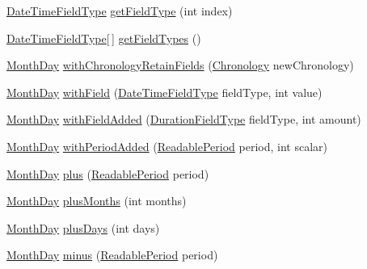 \begin{DoxyCompactItemize}
\hyperlink{classorg_1_1joda_1_1time_1_1_date_time_field_type}{Date\-Time\-Field\-Type} \hyperlink{classorg_1_1joda_1_1time_1_1_month_day_aec54e0264beec25837765b09426116ca}{get\-Field\-Type} (int index)
\item 
\hyperlink{classorg_1_1joda_1_1time_1_1_date_time_field_type}{Date\-Time\-Field\-Type}\mbox{[}$\,$\mbox{]} \hyperlink{classorg_1_1joda_1_1time_1_1_month_day_afae6cc3f6e956a80c9c72eb57085e634}{get\-Field\-Types} ()
\item 
\hyperlink{classorg_1_1joda_1_1time_1_1_month_day}{Month\-Day} \hyperlink{classorg_1_1joda_1_1time_1_1_month_day_afee9114b37976ec8cc136e2e402aff7a}{with\-Chronology\-Retain\-Fields} (\hyperlink{classorg_1_1joda_1_1time_1_1_chronology}{Chronology} new\-Chronology)
\item 
\hyperlink{classorg_1_1joda_1_1time_1_1_month_day}{Month\-Day} \hyperlink{classorg_1_1joda_1_1time_1_1_month_day_a68d9dd819adea60af4e054a2d4a71400}{with\-Field} (\hyperlink{classorg_1_1joda_1_1time_1_1_date_time_field_type}{Date\-Time\-Field\-Type} field\-Type, int value)
\item 
\hyperlink{classorg_1_1joda_1_1time_1_1_month_day}{Month\-Day} \hyperlink{classorg_1_1joda_1_1time_1_1_month_day_a1a3f3337a2b24dcee315cf4a407a131b}{with\-Field\-Added} (\hyperlink{classorg_1_1joda_1_1time_1_1_duration_field_type}{Duration\-Field\-Type} field\-Type, int amount)
\item 
\hyperlink{classorg_1_1joda_1_1time_1_1_month_day}{Month\-Day} \hyperlink{classorg_1_1joda_1_1time_1_1_month_day_a2dd68129c463e3bad89cac3f02ebfb96}{with\-Period\-Added} (\hyperlink{interfaceorg_1_1joda_1_1time_1_1_readable_period}{Readable\-Period} period, int scalar)
\item 
\hyperlink{classorg_1_1joda_1_1time_1_1_month_day}{Month\-Day} \hyperlink{classorg_1_1joda_1_1time_1_1_month_day_aa0d59da1c57f69d63bda9b568326dd29}{plus} (\hyperlink{interfaceorg_1_1joda_1_1time_1_1_readable_period}{Readable\-Period} period)
\item 
\hyperlink{classorg_1_1joda_1_1time_1_1_month_day}{Month\-Day} \hyperlink{classorg_1_1joda_1_1time_1_1_month_day_acb85db22e8b232b81d184a965856f3ef}{plus\-Months} (int months)
\item 
\hyperlink{classorg_1_1joda_1_1time_1_1_month_day}{Month\-Day} \hyperlink{classorg_1_1joda_1_1time_1_1_month_day_abefce3678c2cd2e8afdeb32bd9f3f183}{plus\-Days} (int days)
\item 
\hyperlink{classorg_1_1joda_1_1time_1_1_month_day}{Month\-Day} \hyperlink{classorg_1_1joda_1_1time_1_1_month_day_a1ca5f8360cd7bfe88d0434757629fe2f}{minus} (\hyperlink{interfaceorg_1_1joda_1_1time_1_1_readable_period}{Readable\-Period} period)

\end{DoxyCompactItemize}
